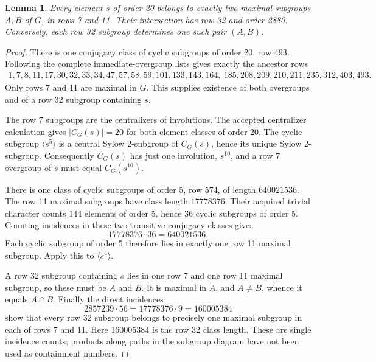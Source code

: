 \documentclass[11pt,a4paper]{article}
\newtheorem{lemma}{Lemma}\newtheorem{theorem}{Theorem}
\begin{document}
\begin{lemma}\label{two}
Every element $s$ of order 20 belongs to exactly two maximal subgroups
$A,B$ of $G$, in rows 7 and 11. Their intersection has row 32 and
order 2880. Conversely, each row 32 subgroup determines one such
pair $(A,B)$.
\end{lemma}
\begin{proof}
There is one conjugacy class of cyclic subgroups of order 20, row 493.
Following the complete immediate-overgroup lists gives exactly the
ancestor rows
\[
\begin{gathered}
1,7,8,11,17,30,32,33,34,47,57,58,59,101,133,143,164,\
185,208,209,210,211,235,312,403,493.
\end{gathered}
\]
Only rows 7 and 11 are maximal in $G$. This supplies existence of
both overgroups and of a row 32 subgroup containing $s$.

The row 7 subgroups are the centralizers of involutions. The accepted
centralizer calculation gives $|C_G(s)|=20$ for both element classes
of order 20. The cyclic subgroup $\langle s^5\rangle$ is a central
Sylow 2-subgroup of $C_G(s)$, hence its unique Sylow 2-subgroup.
Consequently $C_G(s)$ has just one involution, $s^{10}$, and a row 7
overgroup of $s$ must equal $C_G(s^{10})$.

There is one class of cyclic subgroups of order 5, row 574, of length
$640021536$. The row 11 maximal subgroups have class length
$17778376$. Their acquired trivial character counts 144 elements
of order 5, hence 36 cyclic subgroups of order 5. Counting incidences
in these two transitive conjugacy classes gives
\[
                    17778376\cdot36=640021536.
\]
Each cyclic subgroup of order 5 therefore lies in exactly one row 11
maximal subgroup. Apply this to $\langle s^4\rangle$.

A row 32 subgroup containing $s$ lies in one row 7 and one row 11
maximal subgroup, so these must be $A$ and $B$. It is maximal in $A$,
and $A\ne B$, whence it equals $A\cap B$. Finally the direct incidences
\[
              2857239\cdot56=17778376\cdot9=160005384
\]
show that every row 32 subgroup belongs to precisely one maximal
subgroup in each of rows 7 and 11. Here 160005384 is the row 32 class
length. These are single incidence counts; products along paths in
the subgroup diagram have not been used as containment numbers.
\end{proof}
\end{document}
